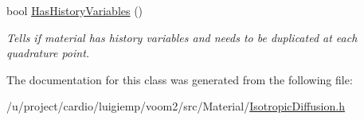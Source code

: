 \begin{DoxyCompactItemize}
\item 
\hypertarget{classvoom_1_1_isotropic_diffusion_a47882d918cb9079d91d670cbbbca5fab}{
bool \hyperlink{classvoom_1_1_isotropic_diffusion_a47882d918cb9079d91d670cbbbca5fab}{HasHistoryVariables} ()}
\label{classvoom_1_1_isotropic_diffusion_a47882d918cb9079d91d670cbbbca5fab}

\begin{DoxyCompactList}\small\item\em Tells if material has history variables and needs to be duplicated at each quadrature point. \item\end{DoxyCompactList}\end{DoxyCompactItemize}


The documentation for this class was generated from the following file:\begin{DoxyCompactItemize}
\item 
/u/project/cardio/luigiemp/voom2/src/Material/\hyperlink{_isotropic_diffusion_8h}{IsotropicDiffusion.h}\end{DoxyCompactItemize}
